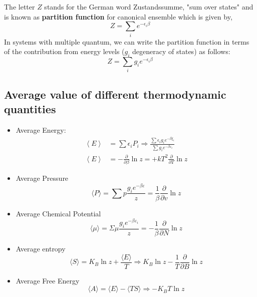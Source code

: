 The letter $Z$ stands for the German word Zustandssumme, "sum over states" and is  known as \textbf{partition function} for canonical ensemble which is given by, 
\begin{equation}
Z=\sum_{i} e^{-\epsilon_{i} \beta}
\end{equation}
In systems with multiple quantum, we can write the partition function in terms of the contribution from energy levels ($g_{i}$ degeneracy of states) as follows:
\begin{equation}
Z=\sum_{i} g_{i} e^{-\epsilon_{i} \beta}
\end{equation}
\begin{center}
\end{center}
\subsection{Average value of different thermodynamic quantities}
\begin{itemize}
	\item  Average Energy:
	\begin{align*}
	\left\langle E\right\rangle&=\sum \epsilon_{i} P_{i} \Rightarrow \frac{\sum \epsilon_{i} g_{i} e^{-\beta \xi_{i}}}{\sum g_{i} e^{-\beta \varepsilon_{i}}}\\
	\left\langle E\right\rangle&=-\frac{\partial}{\partial \beta} \ln z=+k T^{2} \frac{\partial}{\partial T} \ln z
	\end{align*}
	\item  Average Pressure\\
	$$\langle P\rangle=\sum p \frac{g_{i} e^{-\beta \varepsilon}}{z}=\frac{1}{\beta} \frac{\partial}{\partial v} \ln z$$
	\item  Average Chemical Potential\\
	$$\langle\mu\rangle=\Sigma\mu \frac{ g_{i} e^{-\beta \varepsilon_{i}}}{z}=-\frac{1}{\beta} \frac{\partial}{\partial N} \ln z$$
	\item  Average entropy\\
	$$\langle S\rangle=K_{B} \ln z+\frac{\langle E\rangle}{T} \Rightarrow K_{B} \ln z-\frac{1}{T} \frac{\partial}{\partial B} \ln z$$
	\item  Average Free Energy\\
	$$\langle A\rangle=\langle E\rangle-\langle TS\rangle \Rightarrow-K_{B} T \ln z$$
\end{itemize}

